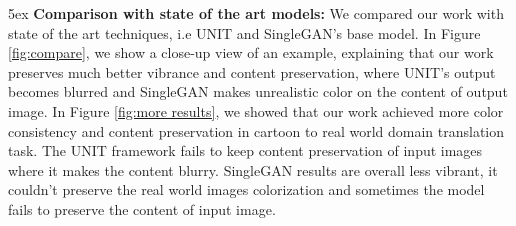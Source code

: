 \documentclass[runningheads]{llncs}
\begin{document}
\parindent 5ex \textbf{Comparison with state of the art models:}
We compared our work with state of the art techniques, i.e UNIT \cite{DBLP:journals/corr/LiuBK17} and SingleGAN's base model\cite{DBLP:journals/corr/abs-1810-04991}. In Figure \ref{fig:compare}, we show a close-up view of an example, explaining that our work preserves much better vibrance and content preservation, where UNIT's\cite{DBLP:journals/corr/LiuBK17} output becomes blurred and SingleGAN\cite{DBLP:journals/corr/abs-1810-04991} makes unrealistic color on the content of output image.  %
In Figure \ref{fig:more results}, we showed that our work achieved more color consistency and content preservation in cartoon to real world domain translation task. The UNIT\cite{DBLP:journals/corr/LiuBK17} framework fails to keep content preservation of input images where it makes the content blurry. SingleGAN\cite{DBLP:journals/corr/abs-1810-04991} results are overall less vibrant, it couldn't preserve the real world images colorization and sometimes the model fails to preserve the content of input image.
\end{document}
